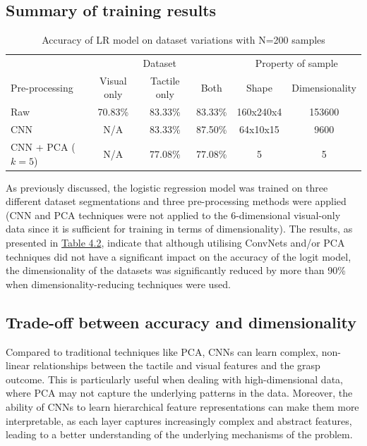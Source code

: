 \documentclass[11pt, a4paper]{report}
\begin{document}
\subsection{Summary of training results}\label{sec:4.5.1}
\label{sec:4.5.1}
\begin{table}[H]
    \centering
    \small
    \begin{tabular}{lccccc}
        \toprule
        & \multicolumn{3}{c}{Dataset} & \multicolumn{2}{c}{Property of sample} \\
        \cmidrule{2-4}\cmidrule{5-6}
        Pre-processing & Visual only & Tactile only & Both & Shape & Dimensionality \\
        \midrule
        Raw & 70.83\% & 83.33\% & 83.33\% & 160x240x4 & 153600 \\
        CNN & N/A & 83.33\% & 87.50\% & 64x10x15  & 9600 \\
        CNN + PCA ($k=5$) & N/A & 77.08\% & 77.08\% & 5 & 5\\
        \bottomrule
    \end{tabular}
    \caption{Accuracy of LR model on dataset variations with N=200 samples}
    \label{tbl:4.2}
\end{table}
As previously discussed, the logistic regression model was trained on three different dataset segmentations and three pre-processing methods were applied (CNN and PCA techniques were not applied to the 6-dimensional visual-only data since it is sufficient for training in terms of dimensionality). The results, as presented in \hyperref[tbl:4.2]{Table 4.2}, indicate that although utilising ConvNets and/or PCA techniques did not have a significant impact on the accuracy of the logit model, the dimensionality of the datasets was significantly reduced by more than 90\% when dimensionality-reducing techniques were used.


\subsection{Trade-off between accuracy and dimensionality}\label{sec:4.5.2}
Compared to traditional techniques like PCA, CNNs can learn complex, non-linear relationships between the tactile and visual features and the grasp outcome. This is particularly useful when dealing with high-dimensional data, where PCA may not capture the underlying patterns in the data. Moreover, the ability of CNNs to learn hierarchical feature representations can make them more interpretable, as each layer captures increasingly complex and abstract features, leading to a better understanding of the underlying mechanisms of the problem.
\end{document}

